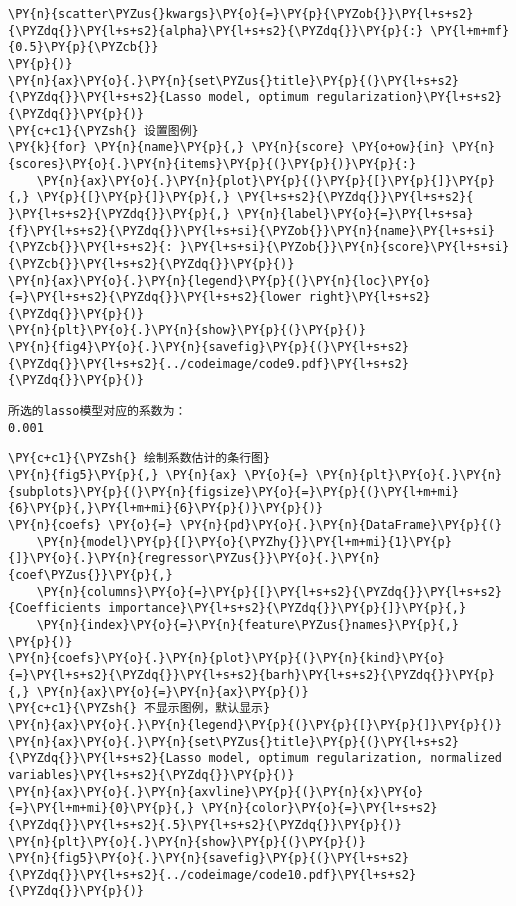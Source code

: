 \begin{Verbatim}[commandchars=\\\{\}]
    \PY{n}{scatter\PYZus{}kwargs}\PY{o}{=}\PY{p}{\PYZob{}}\PY{l+s+s2}{\PYZdq{}}\PY{l+s+s2}{alpha}\PY{l+s+s2}{\PYZdq{}}\PY{p}{:} \PY{l+m+mf}{0.5}\PY{p}{\PYZcb{}}
\PY{p}{)}
\PY{n}{ax}\PY{o}{.}\PY{n}{set\PYZus{}title}\PY{p}{(}\PY{l+s+s2}{\PYZdq{}}\PY{l+s+s2}{Lasso model, optimum regularization}\PY{l+s+s2}{\PYZdq{}}\PY{p}{)}
\PY{c+c1}{\PYZsh{} 设置图例}
\PY{k}{for} \PY{n}{name}\PY{p}{,} \PY{n}{score} \PY{o+ow}{in} \PY{n}{scores}\PY{o}{.}\PY{n}{items}\PY{p}{(}\PY{p}{)}\PY{p}{:}
    \PY{n}{ax}\PY{o}{.}\PY{n}{plot}\PY{p}{(}\PY{p}{[}\PY{p}{]}\PY{p}{,} \PY{p}{[}\PY{p}{]}\PY{p}{,} \PY{l+s+s2}{\PYZdq{}}\PY{l+s+s2}{ }\PY{l+s+s2}{\PYZdq{}}\PY{p}{,} \PY{n}{label}\PY{o}{=}\PY{l+s+sa}{f}\PY{l+s+s2}{\PYZdq{}}\PY{l+s+si}{\PYZob{}}\PY{n}{name}\PY{l+s+si}{\PYZcb{}}\PY{l+s+s2}{: }\PY{l+s+si}{\PYZob{}}\PY{n}{score}\PY{l+s+si}{\PYZcb{}}\PY{l+s+s2}{\PYZdq{}}\PY{p}{)}
\PY{n}{ax}\PY{o}{.}\PY{n}{legend}\PY{p}{(}\PY{n}{loc}\PY{o}{=}\PY{l+s+s2}{\PYZdq{}}\PY{l+s+s2}{lower right}\PY{l+s+s2}{\PYZdq{}}\PY{p}{)}
\PY{n}{plt}\PY{o}{.}\PY{n}{show}\PY{p}{(}\PY{p}{)}
\PY{n}{fig4}\PY{o}{.}\PY{n}{savefig}\PY{p}{(}\PY{l+s+s2}{\PYZdq{}}\PY{l+s+s2}{../codeimage/code9.pdf}\PY{l+s+s2}{\PYZdq{}}\PY{p}{)}
\end{Verbatim}

\begin{Verbatim}[commandchars=\\\{\}]
所选的lasso模型对应的系数为：
0.001
\end{Verbatim}

\begin{Verbatim}[commandchars=\\\{\}]
\PY{c+c1}{\PYZsh{} 绘制系数估计的条行图}
\PY{n}{fig5}\PY{p}{,} \PY{n}{ax} \PY{o}{=} \PY{n}{plt}\PY{o}{.}\PY{n}{subplots}\PY{p}{(}\PY{n}{figsize}\PY{o}{=}\PY{p}{(}\PY{l+m+mi}{6}\PY{p}{,}\PY{l+m+mi}{6}\PY{p}{)}\PY{p}{)}
\PY{n}{coefs} \PY{o}{=} \PY{n}{pd}\PY{o}{.}\PY{n}{DataFrame}\PY{p}{(}
    \PY{n}{model}\PY{p}{[}\PY{o}{\PYZhy{}}\PY{l+m+mi}{1}\PY{p}{]}\PY{o}{.}\PY{n}{regressor\PYZus{}}\PY{o}{.}\PY{n}{coef\PYZus{}}\PY{p}{,}
    \PY{n}{columns}\PY{o}{=}\PY{p}{[}\PY{l+s+s2}{\PYZdq{}}\PY{l+s+s2}{Coefficients importance}\PY{l+s+s2}{\PYZdq{}}\PY{p}{]}\PY{p}{,}
    \PY{n}{index}\PY{o}{=}\PY{n}{feature\PYZus{}names}\PY{p}{,}
\PY{p}{)}
\PY{n}{coefs}\PY{o}{.}\PY{n}{plot}\PY{p}{(}\PY{n}{kind}\PY{o}{=}\PY{l+s+s2}{\PYZdq{}}\PY{l+s+s2}{barh}\PY{l+s+s2}{\PYZdq{}}\PY{p}{,} \PY{n}{ax}\PY{o}{=}\PY{n}{ax}\PY{p}{)}
\PY{c+c1}{\PYZsh{} 不显示图例，默认显示}
\PY{n}{ax}\PY{o}{.}\PY{n}{legend}\PY{p}{(}\PY{p}{[}\PY{p}{]}\PY{p}{)}
\PY{n}{ax}\PY{o}{.}\PY{n}{set\PYZus{}title}\PY{p}{(}\PY{l+s+s2}{\PYZdq{}}\PY{l+s+s2}{Lasso model, optimum regularization, normalized variables}\PY{l+s+s2}{\PYZdq{}}\PY{p}{)}
\PY{n}{ax}\PY{o}{.}\PY{n}{axvline}\PY{p}{(}\PY{n}{x}\PY{o}{=}\PY{l+m+mi}{0}\PY{p}{,} \PY{n}{color}\PY{o}{=}\PY{l+s+s2}{\PYZdq{}}\PY{l+s+s2}{.5}\PY{l+s+s2}{\PYZdq{}}\PY{p}{)}
\PY{n}{plt}\PY{o}{.}\PY{n}{show}\PY{p}{(}\PY{p}{)}
\PY{n}{fig5}\PY{o}{.}\PY{n}{savefig}\PY{p}{(}\PY{l+s+s2}{\PYZdq{}}\PY{l+s+s2}{../codeimage/code10.pdf}\PY{l+s+s2}{\PYZdq{}}\PY{p}{)}
\end{Verbatim}
